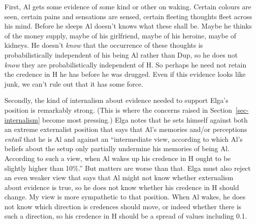 \documentclass[
  11pt,
  letterpaper,
  DIV=11,
  numbers=noendperiod,
  oneside]{scrartcl}
\begin{document}
First, Al gets some evidence of some kind or other on waking. Certain
colours are seen, certain pains and sensations are sensed, certain
fleeting thoughts fleet across his mind. Before he sleeps Al doesn't
knows what these shall be. Maybe he thinks of the money supply, maybe of
his girlfriend, maybe of his heroine, maybe of kidneys. He doesn't
\emph{know} that the occurrence of these thoughts is probabilistically
independent of his being Al rather than Dup, so he does not \emph{know}
they are probabilistically independent of H. So perhaps he need not
retain the credence in H he has before he was drugged. Even if this
evidence looks like junk, we can't rule out that it has some force.

Secondly, the kind of internalism about evidence needed to support
Elga's position is remarkably strong. (This is where the concerns raised
in Section~\ref{sec-internalism} become most pressing.) Elga notes that
he sets himself against both an extreme externalist position that says
that Al's memories and/or perceptions \emph{entail} that he is Al and
against an ``intermediate view, according to which Al's beliefs about
the setup only partially undermine his memories of being Al. According
to such a view, when Al wakes up his credence in H ought to be slightly
higher than 10\%.'' But matters are worse than that. Elga must also
reject an even weaker view that says that Al might not know whether
externalism about evidence is true, so he does not know whether his
credence in H should change. My view is more sympathetic to that
position. When Al wakes, he does not know which direction is credences
should move, or indeed whether there is such a direction, so his
credence in H should be a spread of values including 0.1.
\end{document}
